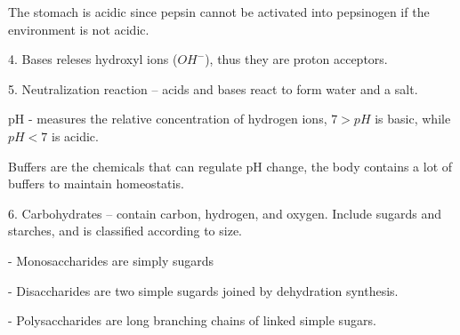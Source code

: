 \documentclass[12pt, UTF8]{article}
\begin{document}
	The stomach is acidic since pepsin cannot be activated into pepsinogen if the environment is not acidic.
	
	4. Bases releses hydroxyl ions ($OH^{-}$), thus they are proton acceptors.
	
	5. Neutralization reaction -- acids and bases react to form water and a salt.
	
	pH - measures the relative concentration of hydrogen ions, $7 > pH$ is basic, while $pH < 7$ is acidic.
	
	Buffers are the chemicals that can regulate pH change, the body contains a lot of buffers to maintain homeostatis.
	
	6. Carbohydrates -- contain carbon, hydrogen, and oxygen. Include sugards and starches, and is classified according to size.
	
	- Monosaccharides are simply sugards
	
	- Disaccharides are two simple sugards joined by dehydration synthesis.
	
	- Polysaccharides are long branching chains of linked simple sugars.
\end{document}
